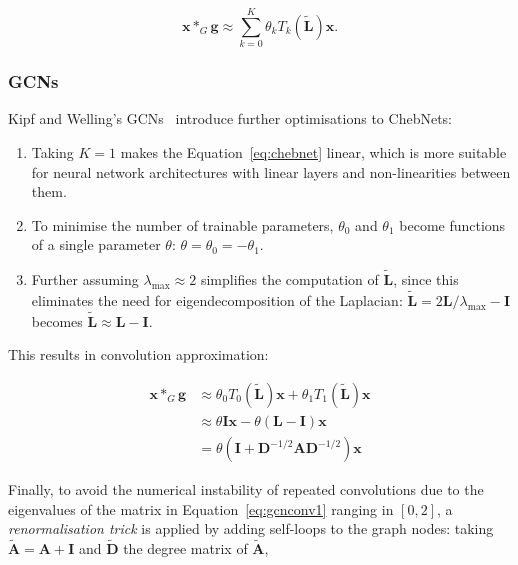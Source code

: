 \begin{equation}
    \label{eq:chebnet}
    \mathbf{x} *_G \mathbf{g} \approx \sum_{k=0}^{K}\theta_k T_k(\mathbf{\tilde{L}})\mathbf{x}.
\end{equation}


\subsubsection{GCNs}
Kipf and Welling's GCNs~\cite{kipf2017semi} introduce further optimisations to ChebNets: 
\begin{enumerate}
    \item Taking $K=1$ makes the Equation~\eqref{eq:chebnet} linear, which is more suitable for neural network architectures with linear layers and non-linearities between them.
    \item To minimise the number of trainable parameters, $\theta_0$ and $\theta_1$ become functions of a single parameter $\theta$: $\theta = \theta_0 = -\theta_1$.
    \item Further assuming $\lambda_{\mathrm{max}}\approx 2$ simplifies the computation of $\mathbf{\tilde{L}}$, since this eliminates the need for eigendecomposition of the Laplacian: $\mathbf{\tilde{L}} = 2\mathbf{L}/\lambda_{\mathrm{max}} - \mathbf{I}$ becomes $\mathbf{\tilde{L}} \approx \mathbf{L} - \mathbf{I}$.
\end{enumerate}

This results in convolution approximation:

\begin{align}
    \mathbf{x} *_G \mathbf{g} &\approx \theta_0 T_0(\mathbf{\tilde{L}}) \mathbf{x} + \theta_1 T_1(\mathbf{\tilde{L}}) \mathbf{x} \\
    &\approx \theta \mathbf{I} \mathbf{x} - \theta (\mathbf{L} - \mathbf{I}) \mathbf{x} \\
    \label{eq:gcnconv1}
    &= \theta(\mathbf{I} + \mathbf{D}^{-1/2}\mathbf{A}\mathbf{D}^{-1/2})\mathbf{x}
\end{align}

Finally, to avoid the numerical instability of repeated convolutions due to the eigenvalues of the matrix in Equation~\eqref{eq:gcnconv1} ranging in $[0, 2]$, a \textit{renormalisation trick} is applied by adding self-loops to the graph nodes: taking $\mathbf{\tilde{A}} = \mathbf{A} + \mathbf{I}$ and $\mathbf{\tilde{D}}$ the degree matrix of $\mathbf{\tilde{A}}$, 

